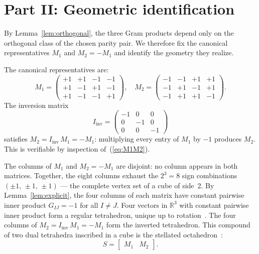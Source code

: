 \documentclass[twocolumn]{iopjournal}
\theoremstyle{definition}
\begin{document}

\section*{Part II: Geometric identification}

By Lemma~\ref{lem:orthogonal}, the three Gram products depend only on
the orthogonal class of the chosen parity pair.  We therefore fix the
canonical representatives $M_1$ and $M_2 = -M_1$ and identify the
geometry they realize.

The canonical representatives are:
\begin{equation}
  M_1 = \begin{pmatrix}
    +1 & +1 & -1 & -1 \\
    +1 & -1 & +1 & -1 \\
    +1 & -1 & -1 & +1
  \end{pmatrix},\quad
  M_2 = \begin{pmatrix}
    -1 & -1 & +1 & +1 \\
    -1 & +1 & -1 & +1 \\
    -1 & +1 & +1 & -1
  \end{pmatrix}.
  \label{eq:M1M2}
\end{equation}
The inversion matrix
\begin{equation}
  I_{\mathrm{inv}} = \begin{pmatrix}
    -1 & 0 & 0 \\
    0 & -1 & 0 \\
    0 & 0 & -1
  \end{pmatrix}
  \label{eq:Iinv}
\end{equation}
satisfies $M_2 = I_{\mathrm{inv}}\,M_1 = -M_1$: multiplying every
entry of $M_1$ by $-1$ produces $M_2$.  This is verifiable by
inspection of~(\ref{eq:M1M2}).

The columns of $M_1$ and $M_2 = -M_1$ are disjoint: no column appears
in both matrices.  Together, the eight columns exhaust the $2^3 = 8$
sign combinations $(\pm 1,\,\pm 1,\,\pm 1)$ --- the complete vertex
set of a cube of side~2.  By Lemma~\ref{lem:explicit}, the four
columns of each matrix have constant pairwise inner product
$G_{IJ} = -1$ for all $I \neq J$.  Four vectors in
$\mathbb{R}^3$ with constant pairwise inner product form a regular
tetrahedron, unique up to rotation~\cite{Coxeter1973}.  The four
columns of $M_2 = I_{\mathrm{inv}}\,M_1 = -M_1$ form the inverted
tetrahedron.  This compound of two dual tetrahedra inscribed in a cube
is the stellated octahedron~\cite{Kepler1619,Cromwell1997}:
\begin{equation}
  S = \begin{bmatrix} M_1 & M_2 \end{bmatrix}.
  \label{eq:stellated}
\end{equation}
\end{document}

